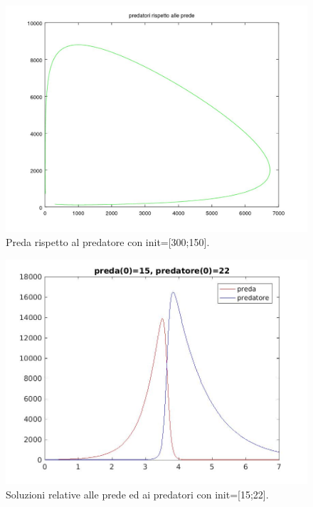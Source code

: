 \documentclass[11pt,a4paper,twoside,openright,titlepage,
headinclude,footinclude,BCOR5mm,
numbers=noenddot,cleardoublepage=empty,
tablecaptionabove]{scrbook}
\begin{document}
\begin{center}
\begin{figure}[h!]
\includegraphics[width=\textwidth]{figs/predatore_preda.jpg}
\caption{Preda rispetto al predatore con init=[300;150].}
\end{figure}
\end{center}
\begin{center}
\begin{figure}[h!]
\includegraphics[width=\textwidth]{figs/preda15.jpg}
\caption{Soluzioni relative alle prede ed ai predatori con init=[15;22].}
\end{figure}
\end{center}
\end{document}

